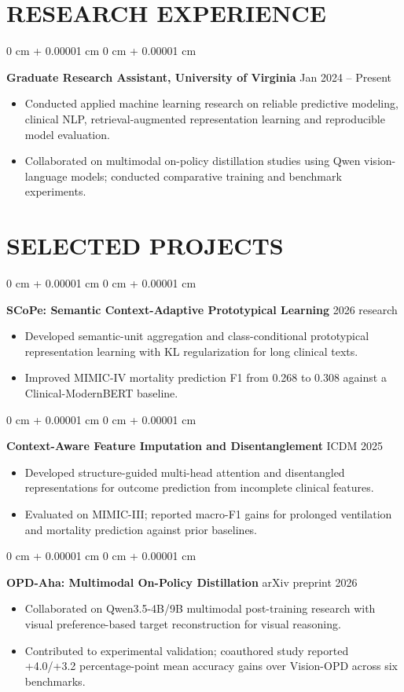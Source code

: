 \documentclass[10pt, letterpaper]{article}
\newenvironment{highlights}{
    \begin{itemize}[
        topsep=0.02 cm,
        parsep=0 cm,
        partopsep=0pt,
        itemsep=0pt,
        leftmargin=0 cm + 10pt
    ]
}{
    \end{itemize}
} %
\newenvironment{onecolentry}{
    \begin{adjustwidth}{
        0 cm + 0.00001 cm
    }{
        0 cm + 0.00001 cm
    }
}{
    \end{adjustwidth}
} %
\begin{document}
\section{RESEARCH EXPERIENCE}
\begin{onecolentry}
\textbf{Graduate Research Assistant, University of Virginia} \hfill Jan 2024 -- Present
\begin{highlights}
\item Conducted applied machine learning research on reliable predictive modeling, clinical NLP, retrieval-augmented representation learning and reproducible model evaluation.
\item Collaborated on multimodal on-policy distillation studies using Qwen vision-language models; conducted comparative training and benchmark experiments.
\end{highlights}
\end{onecolentry}
\section{SELECTED PROJECTS}
\begin{onecolentry}
\textbf{SCoPe: Semantic Context-Adaptive Prototypical Learning} \hfill 2026 research
\begin{highlights}
\item Developed semantic-unit aggregation and class-conditional prototypical representation learning with KL regularization for long clinical texts.
\item Improved MIMIC-IV mortality prediction F1 from 0.268 to 0.308 against a Clinical-ModernBERT baseline.
\end{highlights}
\end{onecolentry}
\vspace{0.04 cm}
\begin{onecolentry}
\textbf{Context-Aware Feature Imputation and Disentanglement} \hfill ICDM 2025
\begin{highlights}
\item Developed structure-guided multi-head attention and disentangled representations for outcome prediction from incomplete clinical features.
\item Evaluated on MIMIC-III; reported macro-F1 gains for prolonged ventilation and mortality prediction against prior baselines.
\end{highlights}
\end{onecolentry}
\vspace{0.04 cm}
\begin{onecolentry}
\textbf{OPD-Aha: Multimodal On-Policy Distillation} \hfill arXiv preprint 2026
\begin{highlights}
\item Collaborated on Qwen3.5-4B/9B multimodal post-training research with visual preference-based target reconstruction for visual reasoning.
\item Contributed to experimental validation; coauthored study reported +4.0/+3.2 percentage-point mean accuracy gains over Vision-OPD across six benchmarks.
\end{highlights}
\end{onecolentry}
\vspace{0.04 cm}
\end{document}
